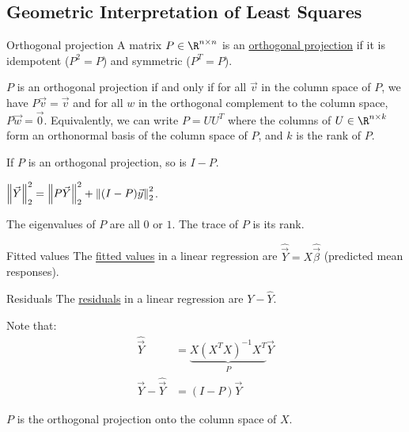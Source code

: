 \documentclass[../Main.tex]{subfiles}
\begin{document}
\subsection{Geometric Interpretation of Least Squares}
\begin{definition}{Orthogonal projection}
    A matrix $P \in \R^{n \times n}$ is an \underline{orthogonal projection} if it is idempotent ($P^2 = P$) and symmetric ($P^T = P$).
\end{definition}
\begin{propositions}{
        
        \label{propsOrthoProj}
    }
    \item $P$ is an orthogonal projection if and only if for all $\vec{v}$ in the column space of $P$, we have $P \vec{v} = \vec{v}$ and for all $w$ in the orthogonal complement to the column space, $P\vec{w} = \vec0$. Equivalently, we can write $P = UU^T$ where the columns of $U \in \R^{n \times k}$ form an orthonormal basis of the column space of $P$, and $k$ is the rank of $P$.
    \item If $P$ is an orthogonal projection, so is $I - P$.
    \item $\left\|\vec{Y}\right\|_2^2 = \left\|P\vec{Y}\right\|_2^2 + \left\|(I-P)\vec{y}\right\|_2^2$.
    \item The eigenvalues of $P$ are all $0$ or $1$. The trace of $P$ is its rank.
\end{propositions}
\begin{definition}{Fitted values}
    The \underline{fitted values} in a linear regression are $\hat{\vec{Y}} = X \hat{\vec{\beta}}$ (predicted mean responses).
\end{definition}
\begin{definition}{Residuals}
    The \underline{residuals} in a linear regression are $Y - \hat{Y}$.
\end{definition}
Note that:
\begin{align*}
    \hat{\vec{Y}} &= \underbrace{X(X^TX)^{-1}X^T}_{P} \vec{Y} \\
    \vec{Y} - \hat{\vec{Y}} &= (I - P)\vec{Y}
\end{align*}
\begin{proposition}
    $P$ is the orthogonal projection onto the column space of $X$.
    \label{propLSEOrthoProj}
\end{proposition}
\end{document}
